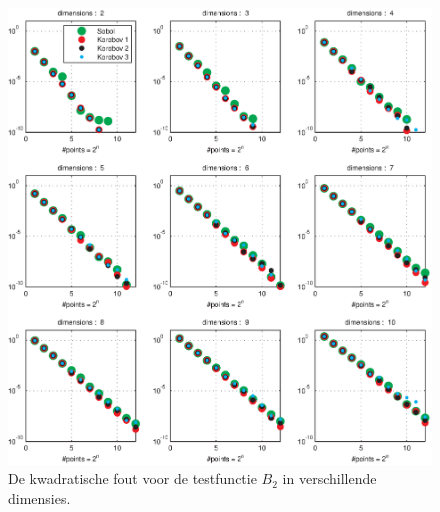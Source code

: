 \documentclass[a4paper, 10pt]{article}
\begin{document}
\begin{figure}[htp]
\centering
\includegraphics{img/korobov3algorithms.eps}
\caption{De kwadratische fout voor de testfunctie $B_2$ in verschillende dimensies.}
\label{fig:korobov3algorithms}
\end{figure}
\end{document}

